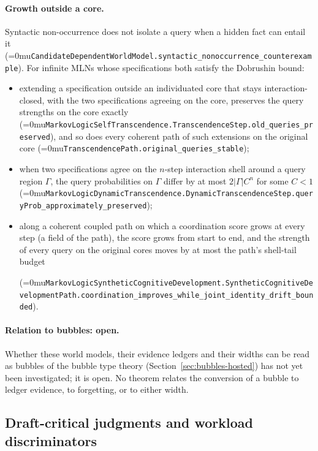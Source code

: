 \documentclass[11pt]{article}
\newcommand{\leanname}[1]{\textup{\Urlmuskip=0mu\relax\nolinkurl{#1}}}
\theoremstyle{definition}
\theoremstyle{remark}
\begin{document}
\paragraph{Growth outside a core.}
Syntactic non-occurrence does not isolate a query when a hidden fact can
entail it (\leanname{CandidateDependentWorldModel.syntactic_nonoccurrence_counterexample}).
For infinite MLNs whose specifications both satisfy the Dobrushin bound:
\begin{itemize}
\item extending a specification outside an individuated core that stays
  interaction-closed, with the two specifications agreeing on the core,
  preserves the query strengths on the core exactly
  (\leanname{MarkovLogicSelfTranscendence.TranscendenceStep.old_queries_preserved}),
  and so does every coherent path of such extensions on the original core
  (\leanname{TranscendencePath.original_queries_stable});
\item when two specifications agree on the $n$-step interaction shell around a
  query region $\Gamma$, the query probabilities on $\Gamma$ differ by at most
  $2|\Gamma|C^n$ for some $C < 1$
  (\leanname{MarkovLogicDynamicTranscendence.DynamicTranscendenceStep.queryProb_approximately_preserved});
\item along a coherent coupled path on which a coordination score grows at
  every step (a field of the path), the score grows from start to end, and the
  strength of every query on the original cores moves by at most the path's
  shell-tail budget
  {\raggedright
  (\leanname{MarkovLogicSyntheticCognitiveDevelopment.SyntheticCognitiveDevelopmentPath.coordination_improves_while_joint_identity_drift_bounded}).\par}
\end{itemize}

\paragraph{Relation to bubbles: open.}
Whether these world models, their evidence ledgers and their widths can be
read as bubbles of the bubble type theory (Section~\ref{sec:bubbles-hosted})
has not yet been investigated; it is open.  No theorem relates the conversion
of a bubble to ledger evidence, to forgetting, or to either width.

\subsection{Draft-critical judgments and workload discriminators}
\label{sec:draft-critical-judgments}
\end{document}
